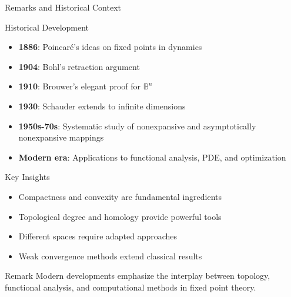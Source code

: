 \documentclass[aspectratio=169,10pt]{beamer}
\begin{document}
\begin{frame}[allowframebreaks]{Remarks and Historical Context}
    \begin{block}{Historical Development}
        \begin{itemize}
            \item \textbf{1886}: Poincaré's ideas on fixed points in dynamics
            \item \textbf{1904}: Bohl's retraction argument
            \item \textbf{1910}: Brouwer's elegant proof for $\mathbb{B}^n$
            \item \textbf{1930}: Schauder extends to infinite dimensions
            \item \textbf{1950s-70s}: Systematic study of nonexpansive and asymptotically nonexpansive mappings
            \item \textbf{Modern era}: Applications to functional analysis, PDE, and optimization
        \end{itemize}
    \end{block}

    \begin{block}{Key Insights}
        \begin{itemize}
            \item Compactness and convexity are fundamental ingredients
            \item Topological degree and homology provide powerful tools
            \item Different spaces require adapted approaches
            \item Weak convergence methods extend classical results
        \end{itemize}
    \end{block}

    \begin{block}{Remark}
        Modern developments emphasize the interplay between topology, functional analysis, and computational methods in fixed point theory.
    \end{block}
\end{frame}
\end{document}
